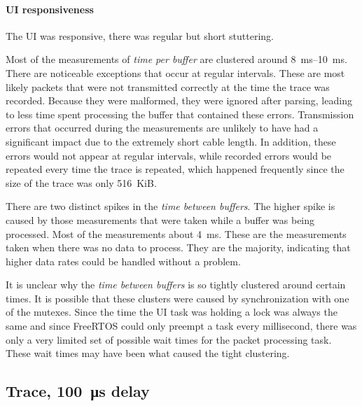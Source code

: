 \paragraph{UI responsiveness}

The UI was responsive, there was regular but short stuttering.
\bigbreak

Most of the measurements of \textit{time per buffer} are clustered around \SIrange{8}{10}{\milli\second}.
There are noticeable exceptions that occur at regular intervals. These are most likely packets that
were not transmitted correctly at the time the trace was recorded. Because they were malformed, they
were ignored after parsing, leading to less time spent processing the buffer that contained these
errors. Transmission errors that occurred during the measurements are unlikely to have had a significant
impact due to the extremely short cable length. In addition, these errors would not appear at regular
intervals, while recorded errors would be repeated every time the trace is repeated, which happened
frequently since the size of the trace was only \SI{516}{KiB}.

There are two distinct spikes in the \textit{time between buffers}. The higher spike is caused by
those measurements that were taken while a buffer was being processed. Most of the measurements
about \SI{4}{\milli\second}. These are the measurements taken when there was no data to process.
They are the majority, indicating that higher data rates could be handled without a problem.

It is unclear why the \textit{time between buffers} is so tightly clustered around certain times.
It is possible that these clusters were caused by synchronization with one of the mutexes. Since the
time the UI task was holding a lock was always the same and since FreeRTOS could only preempt a task
every millisecond, there was only a very limited set of possible wait times for the packet processing
task. These wait times may have been what caused the tight clustering.

\clearpage
\subsection{Trace, \SI{100}{\micro\second} delay}
\label{evaluation/results/trace-100us-delay}

